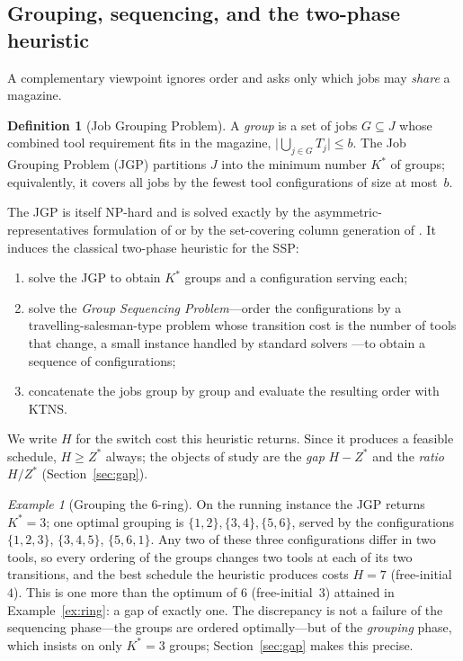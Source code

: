\documentclass[11pt,a4paper]{article}
\theoremstyle{plain}
\theoremstyle{definition}
\newtheorem{definition}{Definition}
\theoremstyle{remark}
\newtheorem{example}{Example}
\newcommand{\Kst}{K^{\ast}}
\newcommand{\Zst}{Z^{\ast}}
\begin{document}
\subsection{Grouping, sequencing, and the two-phase heuristic}\label{ssec:jgp}
A complementary viewpoint ignores order and asks only which jobs may \emph{share} a
magazine.
\begin{definition}[Job Grouping Problem]\label{def:jgp}
A \emph{group} is a set of jobs $G\subseteq J$ whose combined tool requirement fits
in the magazine, $\lvert\bigcup_{j\in G}T_j\rvert\le b$. The Job Grouping Problem
(JGP) partitions $J$ into the minimum number $\Kst$ of groups; equivalently, it
covers all jobs by the fewest tool configurations of size at most~$b$.
\end{definition}
The JGP is itself NP-hard and is solved exactly by the asymmetric-representatives
formulation of \citet{Jans2013} or by the set-covering column generation of
\citet{Crama1994Column}. It induces the classical two-phase heuristic for the SSP:
\begin{enumerate}[noitemsep,topsep=2pt]
  \item solve the JGP to obtain $\Kst$ groups and a configuration serving each;
  \item solve the \emph{Group Sequencing Problem}---order the configurations by a
  travelling-salesman-type problem whose transition cost is the number of tools that
  change, a small instance handled by standard solvers
  \citep{Applegate2006,Helsgaun2015}---to obtain a sequence of configurations;
  \item concatenate the jobs group by group and evaluate the resulting order with
  KTNS.
\end{enumerate}
We write $H$ for the switch cost this heuristic returns. Since it produces a
feasible schedule, $H\ge\Zst$ always; the objects of study are the \emph{gap}
$H-\Zst$ and the \emph{ratio} $H/\Zst$ (Section~\ref{sec:gap}).

\begin{example}[Grouping the $6$-ring]\label{ex:ring-group}
On the running instance the JGP returns $\Kst=3$; one optimal grouping is
$\{1,2\},\{3,4\},\{5,6\}$, served by the configurations $\{1,2,3\}$, $\{3,4,5\}$,
$\{5,6,1\}$. Any two of these three configurations differ in two tools, so every
ordering of the groups changes two tools at each of its two transitions, and the
best schedule the heuristic produces costs $H=7$ (free-initial~$4$). This is one
more than the optimum of $6$ (free-initial~$3$) attained in Example~\ref{ex:ring}:
a gap of exactly one. The discrepancy is not a failure of the sequencing phase---the
groups are ordered optimally---but of the \emph{grouping} phase, which insists on
only $\Kst=3$ groups; Section~\ref{sec:gap} makes this precise.
\end{example}
\end{document}
